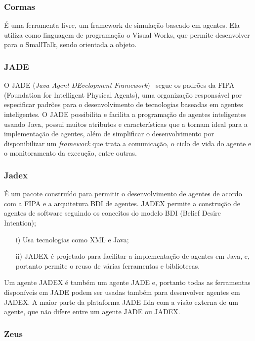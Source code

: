 \subsubsection*{Cormas}

É uma ferramenta livre, um framework de simulação baseado em agentes. Ela utiliza como linguagem de programação o Visual Works, que permite desenvolver para o SmallTalk, sendo orientada a objeto.   

\subsubsection*{JADE}

O JADE (\textit{Java Agent DEvelopment Framework})~\citep{Bellifemine:2003} segue os padrões da FIPA (Foundation for Intelligent Physical Agents),  uma organização responsável por especificar padrões para o desenvolvimento de tecnologias baseadas em agentes inteligentes. O JADE possibilita e facilita a programação de agentes inteligentes usando Java, possui muitos atributos e características que a tornam ideal para a implementação de agentes, além de simplificar o desenvolvimento por disponibilizar um \textit{framework} que trata a comunicação, o ciclo de vida do agente e o monitoramento da execução, entre outras.

\subsubsection*{Jadex}

É um pacote construído para permitir o desenvolvimento de agentes de acordo com a FIPA e a arquitetura BDI de agentes. JADEX permite a construção de agentes de software seguindo os conceitos do modelo BDI (Belief Desire Intention);

\begin{itemize}
\item [i)] Usa tecnologias como XML e Java;
\item [ii)] JADEX é projetado para facilitar a implementação de agentes em Java, e, portanto permite o reuso de várias ferramentas e bibliotecas.
\end{itemize}
	Um agente JADEX é também um agente JADE e, portanto todas as ferramentas disponíveis em JADE podem ser usadas também para desenvolver agentes em JADEX. A maior parte da plataforma JADE lida com a visão externa de um agente, que não difere entre um agente JADE ou JADEX.

\subsubsection*{Zeus}

